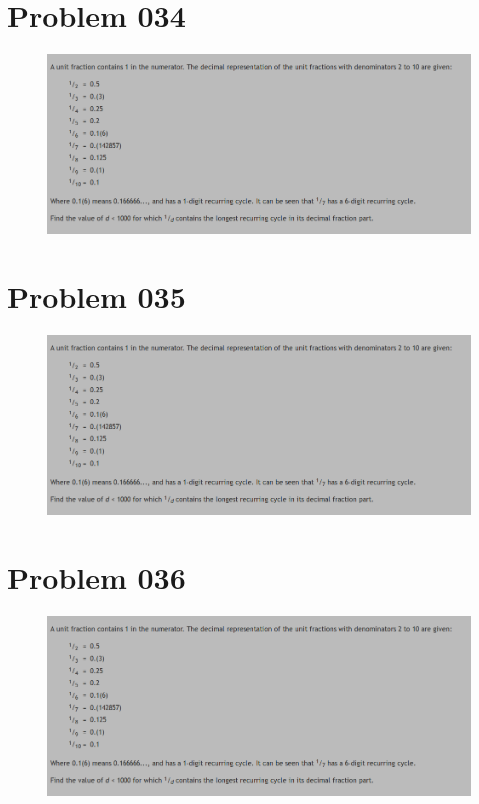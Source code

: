 \section{Problem 034}
\begin{prob}
	\begin{figure}[htb!]
		\begin{center}
			\includegraphics[scale = 0.4]{pic/026.png}
		\end{center}
	\end{figure}
\end{prob}
\section{Problem 035}
\begin{prob}
	\begin{figure}[htb!]
		\begin{center}
			\includegraphics[scale = 0.4]{pic/026.png}
		\end{center}
	\end{figure}
\end{prob}
\section{Problem 036}
\begin{prob}
	\begin{figure}[htb!]
		\begin{center}
			\includegraphics[scale = 0.4]{pic/026.png}
		\end{center}
	\end{figure}
\end{prob}
